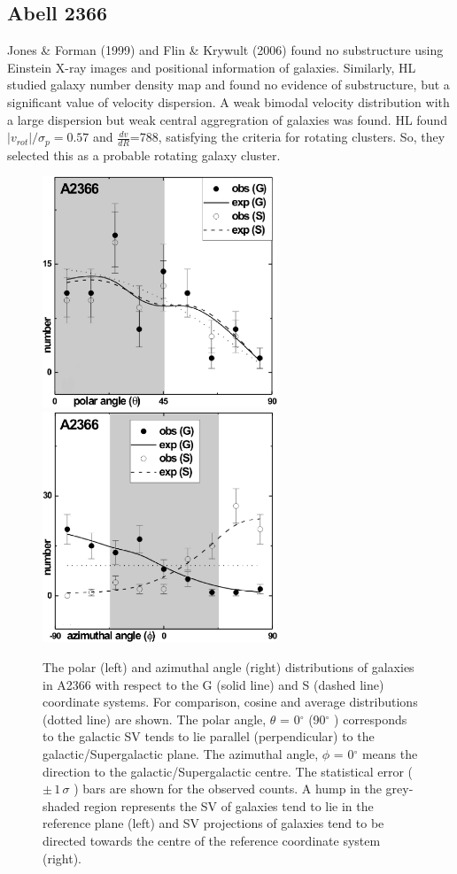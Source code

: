 \subsection{Abell 2366} Jones \& Forman (1999) and Flin \& Krywult (2006) found no substructure using Einstein X-ray images and positional information of galaxies. Similarly, HL studied galaxy number density map and found no evidence of substructure, but a significant value of velocity dispersion. A weak bimodal velocity distribution with a large dispersion but weak central aggregration of galaxies was found. HL found ${|v_{rot}|}/{\sigma_p}= 0.57$ and $\frac{dv}{dR}$=788, satisfying the criteria for rotating clusters. So, they selected this as a probable rotating galaxy cluster.
\begin{figure}[H]
\centering
 \includegraphics[height=6.9cm]{A2366_theta.eps}
   \includegraphics[height=6.9cm]{A2366_phi.eps}
     \caption{The polar (left) and azimuthal angle (right) distributions of galaxies in A2366
with respect to the G (solid line) and S (dashed line) coordinate systems.
For comparison, cosine and average distributions (dotted line) are shown.
The polar angle, $\theta$ = 0$^\circ$ (90$^\circ$ ) corresponds to the galactic SV tends to lie
parallel (perpendicular) to the galactic/Supergalactic plane. The azimuthal
angle, $\phi$ = 0$^\circ$ means the direction to the galactic/Supergalactic centre. The
statistical error ($\pm\, 1\, \sigma$ ) bars are shown for the observed counts. A hump in the
grey-shaded region represents the SV of galaxies tend to lie in the reference
plane (left) and SV projections of galaxies tend to be directed towards the
centre of the reference coordinate system (right).}
   
\end{figure}


